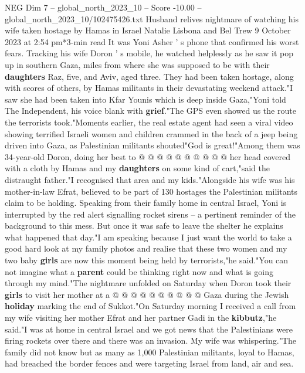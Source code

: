 \begin{textsample}{NEG Dim 7 – global\_north\_2023\_10 – Score -10.00 – global\_north\_2023\_10/102475426.txt}  \label{ex:f7_neg_030}
Husband relives nightmare of watching his wife taken hostage by Hamas in Israel Natalie Lisbona and Bel Trew 9 October 2023 at 2:54 pm*3-min read It was Yoni Asher ' s phone that confirmed his worst fears.
Tracking his wife Doron ' s mobile, he watched helplessly as he saw it pop up in southern Gaza, miles from where she was supposed to be with their \textbf{daughters} Raz, five, and Aviv, aged three.
They had been taken hostage, along with scores of others, by Hamas militants in their devastating weekend attack."I saw she had been taken into Kfar Younis which is deep inside Gaza,"Yoni told The Independent, his voice blank with \textbf{grief}."The GPS even showed us the route the terrorists took."Moments earlier, the real estate agent had seen a viral video showing terrified Israeli women and children crammed in the back of a jeep being driven into Gaza, as Palestinian militants shouted"God is great!"Among them was 34-year-old Doron, doing her best to @ @ @ @ @ @ @ @ @ @ her head covered with a cloth by Hamas and my \textbf{daughters} on some kind of cart,"said the distraught father."I recognised that area and my kids."Alongside his wife was his mother-in-law Efrat, believed to be part of 130 hostages the Palestinian militants claim to be holding.
Speaking from their family home in central Israel, Yoni is interrupted by the red alert signalling rocket sirens -- a pertinent reminder of the background to this mess.
But once it was safe to leave the shelter he explains what happened that day."I am speaking because I just want the world to take a good hard look at my family photos and realise that these two women and my two baby \textbf{girls} are now this moment being held by terrorists,"he said."You can not imagine what a \textbf{parent} could be thinking right now and what is going through my mind."The nightmare unfolded on Saturday when Doron took their \textbf{girls} to visit her mother at a @ @ @ @ @ @ @ @ @ @ Gaza during the Jewish \textbf{holiday} marking the end of Sukkot."On Saturday morning I received a call from my wife visiting her mother Efrat and her partner Gadi in the \textbf{kibbutz},"he said."I was at home in central Israel and we got news that the Palestinians were firing rockets over there and there was an invasion.
My wife was whispering."The family did not know but as many as 1,000 Palestinian militants, loyal to Hamas, had breached the border fences and were targeting Israel from land, air and sea.

\end{textsample}

